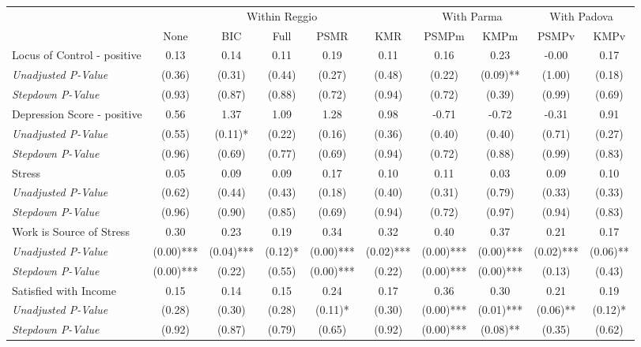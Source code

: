 \begin{tabular}{l c c c c c c c c c}
\toprule
& \multicolumn{5}{c}{Within Reggio} & \multicolumn{2}{c}{With Parma} & \multicolumn{2}{c}{With Padova} \\\cmidrule(lr){2-6} \cmidrule(lr){7-8} \cmidrule(lr){9-10}
 & None & BIC & Full & PSMR & KMR & PSMPm & KMPm & PSMPv & KMPv \\
\midrule
Locus of Control - positive & 0.13 & 0.14 & 0.11 & 0.19 & 0.11 & 0.16 & 0.23 & -0.00 & 0.17 \\
\quad \textit{Unadjusted P-Value} & (0.36) & (0.31) & (0.44) & (0.27) & (0.48) & (0.22) & (0.09)** & (1.00) & (0.18) \\
\quad \textit{Stepdown P-Value} & (0.93) & (0.87) & (0.88) & (0.72) & (0.94) & (0.72) & (0.39) & (0.99) & (0.69) \\
Depression Score - positive & 0.56 & 1.37 & 1.09 & 1.28 & 0.98 & -0.71 & -0.72 & -0.31 & 0.91 \\
\quad \textit{Unadjusted P-Value} & (0.55) & (0.11)* & (0.22) & (0.16) & (0.36) & (0.40) & (0.40) & (0.71) & (0.27) \\
\quad \textit{Stepdown P-Value} & (0.96) & (0.69) & (0.77) & (0.69) & (0.94) & (0.72) & (0.88) & (0.99) & (0.83) \\
Stress & 0.05 & 0.09 & 0.09 & 0.17 & 0.10 & 0.11 & 0.03 & 0.09 & 0.10 \\
\quad \textit{Unadjusted P-Value} & (0.62) & (0.44) & (0.43) & (0.18) & (0.40) & (0.31) & (0.79) & (0.33) & (0.33) \\
\quad \textit{Stepdown P-Value} & (0.96) & (0.90) & (0.85) & (0.69) & (0.94) & (0.72) & (0.97) & (0.94) & (0.83) \\
Work is Source of Stress & 0.30 & 0.23 & 0.19 & 0.34 & 0.32 & 0.40 & 0.37 & 0.21 & 0.17 \\
\quad \textit{Unadjusted P-Value} & (0.00)*** & (0.04)*** & (0.12)* & (0.00)*** & (0.02)*** & (0.00)*** & (0.00)*** & (0.02)*** & (0.06)** \\
\quad \textit{Stepdown P-Value} & (0.00)*** & (0.22) & (0.55) & (0.00)*** & (0.22) & (0.00)*** & (0.00)*** & (0.13) & (0.43) \\
Satisfied with Income & 0.15 & 0.14 & 0.15 & 0.24 & 0.17 & 0.36 & 0.30 & 0.21 & 0.19 \\
\quad \textit{Unadjusted P-Value} & (0.28) & (0.30) & (0.28) & (0.11)* & (0.30) & (0.00)*** & (0.01)*** & (0.06)** & (0.12)* \\
\quad \textit{Stepdown P-Value} & (0.92) & (0.87) & (0.79) & (0.65) & (0.92) & (0.00)*** & (0.08)** & (0.35) & (0.62) \\

\end{tabular}
